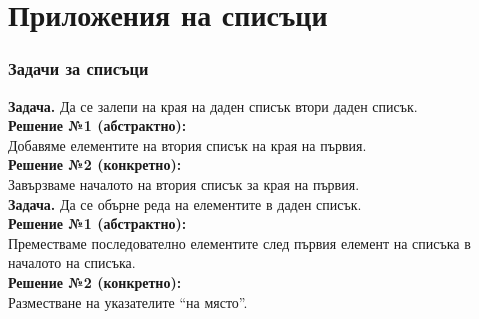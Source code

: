 \documentclass[alsotrans]{beamerswitch}
\begin{document}

\section{Приложения на списъци}

\begin{frame}
  \frametitle{Задачи за списъци}

  \textbf{Задача.} Да се залепи на края на даден списък втори даден списък.\\[2ex]
  \pause
  \textbf{Решение №1 (абстрактно):} \\
  Добавяме елементите на втория списък на края на първия.\\[2ex]
  \pause
  \textbf{Решение №2 (конкретно):} \\
  Завързваме началото на втория списък за края на първия.\\[2ex]
  \pause\pause
  \textbf{Задача.} Да се обърне реда на елементите в даден списък.\\[2ex]
  \pause
  \textbf{Решение №1 (абстрактно):}\\
  Преместваме последователно елементите след първия елемент на списъка в началото на списъка.\\[2ex]
  \pause
  \textbf{Решение №2 (конкретно):}\\
  Разместване на указателите ``на място''.
\end{frame}
\end{document}

